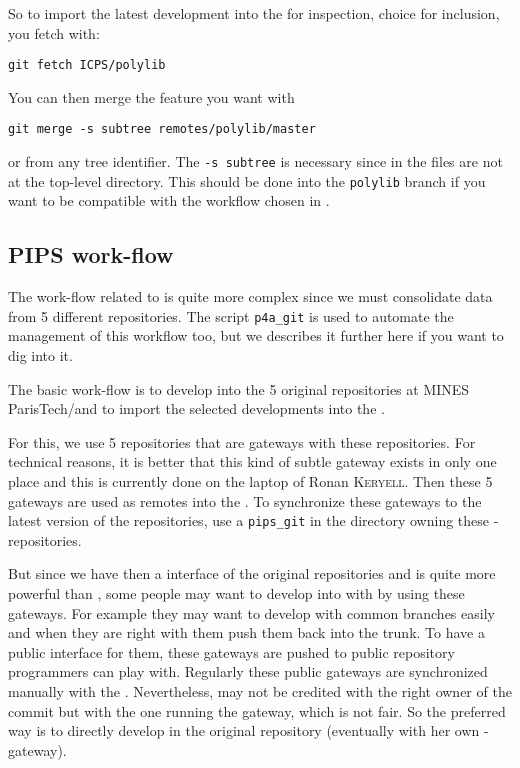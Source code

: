 \documentclass[a4paper]{article}
\begin{document}
So to import the latest \Apolylib development into the \Apfa{} \Agit for
inspection, choice for inclusion, you fetch \Apolylib with:
\begin{verbatim}
git fetch ICPS/polylib
\end{verbatim}

You can then merge the feature you want with
\begin{verbatim}
git merge -s subtree remotes/polylib/master
\end{verbatim}
or from any tree identifier. The \texttt{-s subtree} is necessary since in
\Apfa the \Apolylib files are not at the top-level directory. This should
be done into the \texttt{polylib} branch if you want to be compatible with
the workflow chosen in \Apfa.


\subsection{PIPS work-flow}
\label{sec:pips-workflow}

The work-flow related to \Apips is quite more complex since we must
consolidate data from 5 different \Asvn repositories. The script
\verb|p4a_git| is used to automate the management of this workflow too,
but we describes it further here if you want to dig into it.

The basic \Apips work-flow is to develop into the 5 original \Apips{}
\Asvn repositories at MINES ParisTech/\Acri and to import the selected
developments into the \Apfa{} \Agit.

For this, we use 5 \Agit repositories that are gateways with these \Asvn
repositories. For technical reasons, it is better that this kind of subtle
gateway exists in only one place and this is currently done on the laptop
of Ronan \textsc{Keryell}. Then these 5 gateways are used as remotes into
the \Apfa{} \Agit. To synchronize these gateways to the latest version of
the \Apips{} \Asvn repositories, use a \verb|pips_git| in the directory
owning these \Agit-\Asvn repositories.

But since we have then a \Agit interface of the original \Apips{} \Asvn
repositories and \Agit is quite more powerful than \Asvn, some people may
want to develop into \Apips with \Agit by using these gateways. For
example they may want to develop with common branches easily and when they
are right with them push them back into the \Apips{} \Asvn trunk. To have
a public interface for them, these \Agit gateways are pushed to public
\Agit repository programmers can play with. Regularly these public
gateways are synchronized manually with the \Apips{} \Asvn. Nevertheless,
\Asvn may not be credited with the right owner of the commit but with the
one running the gateway, which is not fair. So the preferred way is to
directly develop in the original \Apips \Asvn repository (eventually with
her own \Agit-\Asvn gateway).
\end{document}
